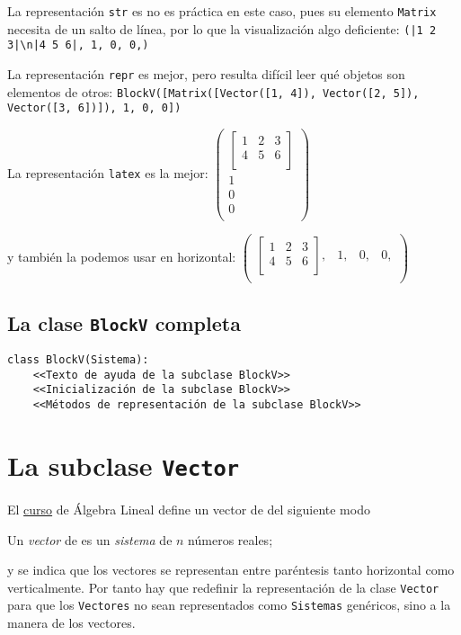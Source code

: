 \documentclass[11pt]{report}
\begin{document}
La representación \texttt{str} es no es práctica en este caso, pues su
elemento \texttt{Matrix} necesita de un salto de línea, por lo que la
visualización algo deficiente:
\texttt{(|1 2 3|\textbackslash{}n|4 5 6|, 1, 0, 0,)}

La representación \texttt{repr} es mejor, pero resulta difícil leer 
qué objetos son elementos de otros:
\texttt{BlockV([Matrix([Vector([1, 4]), Vector([2, 5]), Vector([3, 6])]), 1, 0, 0])}

La representación \texttt{latex} es la mejor:
\(\displaystyle \left( \begin{array}{c}\left[ \begin{array}{ccc}1&2&3\\4&5&6\\ \end{array} \right]\\1\\0\\0\\ \end{array} \right)\)

y también la podemos usar en horizontal:
\(\displaystyle \left( \begin{array}{cccc}\left[ \begin{array}{ccc}1&2&3\\4&5&6\\ \end{array} \right],& 1,& 0,& 0,\\ \end{array} \right)\)

\section{La clase \texttt{BlockV} completa}
\label{sec:org39e67b7}

\begin{verbatim}
class BlockV(Sistema):
    <<Texto de ayuda de la subclase BlockV>>
    <<Inicialización de la subclase BlockV>>
    <<Métodos de representación de la subclase BlockV>>
\end{verbatim}


\chapter{La subclase \texttt{Vector}}
\label{sec:org55b4a84}

El \href{https://mbujosab.github.io/CursoDeAlgebraLineal/libro.pdf\#section.1.1}{curso} de Álgebra Lineal define un vector de \R[n] del siguiente
modo
\begin{center}
  Un \emph{vector} de \R[n] es un \emph{sistema} de $n$ números reales;
\end{center}
y se indica que los vectores se representan entre paréntesis tanto
horizontal como verticalmente. Por tanto hay que redefinir la
representación de la clase \texttt{Vector} para que los \texttt{Vectores} no sean
representados como \texttt{Sistemas} genéricos, sino a la manera de los
vectores.
\end{document}
